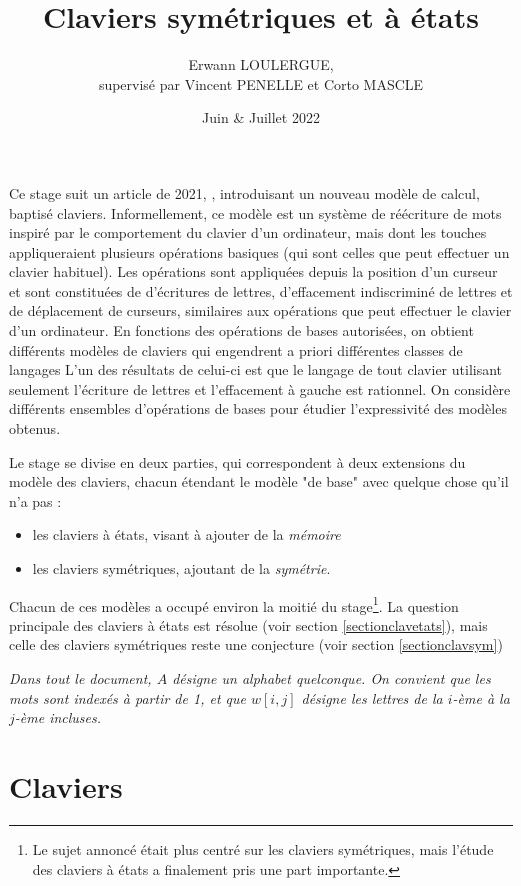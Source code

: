 \documentclass[12pt, a4paper]{article}
\title{Claviers symétriques et à états}
\author{Erwann LOULERGUE, \\ supervisé par Vincent PENELLE et Corto MASCLE}
\date{Juin \& Juillet 2022}
\begin{document}
    \maketitle
    Ce stage suit un article de 2021, \cite{bible}, introduisant un nouveau modèle de calcul,
    baptisé claviers.
    Informellement, ce modèle est un système de réécriture de mots inspiré par le comportement du clavier d’un ordinateur, mais dont les touches appliqueraient plusieurs opérations basiques (qui sont celles que peut effectuer un clavier habituel). Les opérations sont appliquées depuis la position d’un curseur et sont constituées de d’écritures de lettres, d’effacement indiscriminé de lettres et de déplacement de curseurs, similaires aux opérations que peut effectuer le clavier d’un ordinateur. En fonctions des opérations de bases autorisées, on obtient différents modèles de claviers qui engendrent a priori différentes classes de langages
    L’un des résultats de celui-ci est que le langage de tout clavier
    utilisant seulement l’écriture de lettres et l’effacement à gauche est rationnel. 
    On considère différents ensembles d’opérations de bases pour étudier l’expressivité des modèles obtenus.
    
    Le stage se divise en deux parties, qui correspondent à deux extensions du modèle des claviers, chacun étendant le modèle "de base" avec quelque chose qu'il n'a pas :
    \begin{itemize}
        \item les claviers à états, visant à ajouter de la  \emph{mémoire}
        \item les claviers symétriques, ajoutant de la \emph{symétrie}.
    \end{itemize}
    
    Chacun de ces modèles a occupé environ la moitié du stage\footnote{Le sujet annoncé était plus centré sur les claviers symétriques, mais l'étude des claviers à états a finalement pris une part importante.}. 
    La question principale des claviers à états est résolue (voir section \ref{sectionclavetats}), mais celle des claviers symétriques reste une conjecture (voir section \ref{sectionclavsym})
    \clearpage    
    
    
    \emph{Dans tout le document, $A$ désigne un alphabet quelconque. On convient que les mots sont indexés à partir de 1, et que $w[i,j]$ désigne les lettres de la $i$-ème à la $j$-ème incluses.}
    \section{Claviers}
\end{document}
